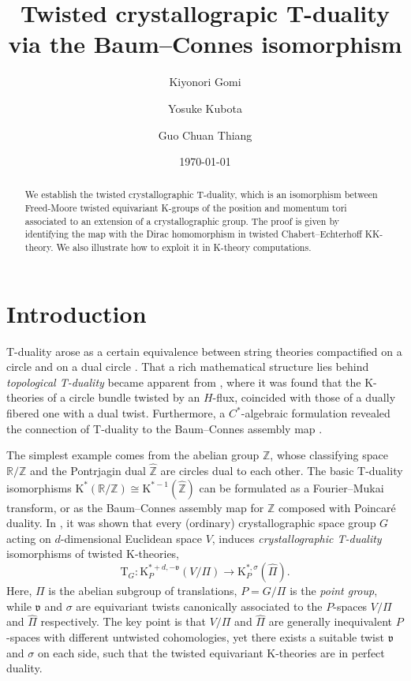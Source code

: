 \documentclass[11pt]{amsart}
\title[Twisted crystallographic T-duality]{Twisted crystallograpic T-duality via the Baum--Connes isomorphism}
\date{\today}
\author{Kiyonori Gomi}
\author{Yosuke Kubota}
\author{Guo Chuan Thiang}
\theoremstyle{definition}
\theoremstyle{plain}
\theoremstyle{remark}
\newcommand{\bR}{\mathbb{R}}
\newcommand{\bZ}{\mathbb{Z}}
\newcommand{\fv}{\mathfrak{v}}
\newcommand{\K}{\mathrm{K}}%
\begin{document}
\maketitle
\begin{abstract}
We establish the twisted crystallographic T-duality, which is an isomorphism between Freed-Moore twisted equivariant K-groups of the position and momentum tori associated to an extension of a crystallographic group. 
The proof is given by identifying the map with the Dirac homomorphism in twisted Chabert--Echterhoff KK-theory.
We also illustrate how to exploit it in K-theory computations.
\end{abstract}
\tableofcontents

\section{Introduction}
T-duality arose as a certain equivalence between string theories compactified on a circle and on a dual circle \cite{buscher1987symmetry}. That a rich mathematical structure lies behind \emph{topological T-duality} became apparent from \cite{bouwknegtDualityTopologyChange2004}, where it was found that the K-theories of a circle bundle twisted by an $H$-flux, coincided with those of a dually fibered one with a dual twist. Furthermore, a $C^*$-algebraic formulation \cite{mathaiDualityTorusBundles2005} revealed the connection of T-duality to the Baum--Connes assembly map \cite{baumClassifyingSpaceProper1994}.

The simplest example comes from the abelian group $\bZ$, whose classifying space $\bR/\bZ$ and the Pontrjagin dual $\hat{\bZ}$ are circles dual to each other. The basic T-duality isomorphisms $\K^*(\bR/\bZ)\cong \K^{*-1}(\hat{\bZ})$ can be formulated as a Fourier--Mukai transform, or as the Baum--Connes assembly map for $\bZ$ composed with Poincar\'{e} duality. In \cite{gomiCrystallographicTduality2019}, it was shown that every (ordinary) crystallographic space group $G$ acting on $d$-dimensional Euclidean space $V$, induces \emph{crystallographic T-duality} isomorphisms of twisted K-theories,
\begin{equation}
    \mathrm{T}_G:\K^{*+d,- \fv}_{P}(V/\Pi) \to \K_P^{*,\sigma}(\hat{\Pi}) . \label{eqn:old.crystal.T.duality}
\end{equation}
Here, $\Pi$ is the abelian subgroup of translations, $P=G/\Pi$ is the \emph{point group}, while $\fv$ and $\sigma$ are equivariant twists canonically associated to the $P$-spaces $V/\Pi$ and $\hat{\Pi}$ respectively. The key point is that $V/\Pi$ and $\hat{\Pi}$ are generally inequivalent $P$-spaces with different untwisted cohomologies, yet there exists a suitable twist $\fv$ and $\sigma$ on each side, such that the twisted equivariant K-theories are in perfect duality.
\end{document}
